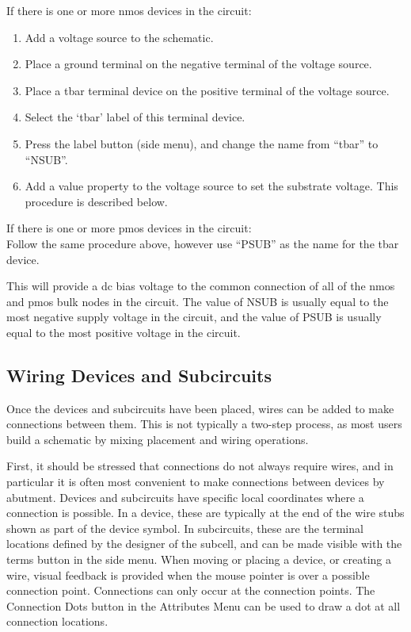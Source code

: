 \begin{description}
\item{If there is one or more {\et nmos} devices in the circuit:}\\
\begin{enumerate}
\item{Add a voltage source to the schematic.}
\item{Place a ground terminal on the negative terminal of the
    voltage source.}
\item{Place a {\et tbar} terminal device on the positive terminal of
    the voltage source.}
\item{Select the `tbar' label of this terminal device.}
\item{Press the {\cb label} button (side menu), and change the name from
    ``tbar'' to ``NSUB''.}
\item{Add a {\et value} property to the voltage source to set the
    substrate voltage.  This procedure is described below.}
\end{enumerate}
\item{If there is one or more {\et pmos} devices in the circuit:}\\
Follow the same procedure above, however use ``PSUB'' as the name
    for the {\et tbar} device.
\end{description}

This will provide a dc bias voltage to the common connection of all of
the {\et nmos} and {\et pmos} bulk nodes in the circuit.  The value of
NSUB is usually equal to the most negative supply voltage in the
circuit, and the value of PSUB is usually equal to the most positive
voltage in the circuit.

\subsection{Wiring Devices and Subcircuits}

Once the devices and subcircuits have been placed, wires can be added
to make connections between them.  This is not typically a two-step
process, as most users build a schematic by mixing placement and wiring
operations.

First, it should be stressed that connections do not always require
wires, and in particular it is often most convenient to make
connections between devices by abutment.  Devices and subcircuits have
specific local coordinates where a connection is possible.  In a
device, these are typically at the end of the wire stubs shown as part
of the device symbol.  In subcircuits, these are the terminal
locations defined by the designer of the subcell, and can be made
visible with the {\cb terms} button in the side menu.  When moving or
placing a device, or creating a wire, visual feedback is provided when
the mouse pointer is over a possible connection point.  Connections
can only occur at the connection points.  The {\cb Connection Dots}
button in the {\cb Attributes Menu} can be used to draw a dot at all
connection locations.

